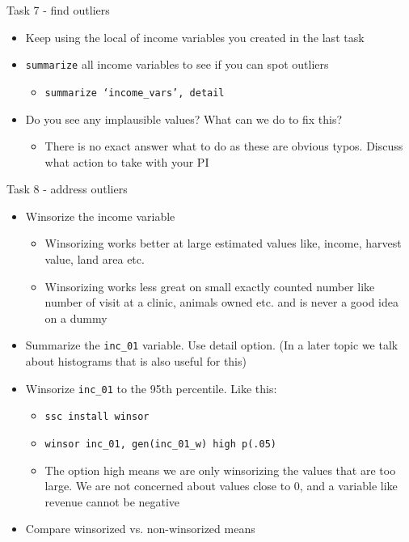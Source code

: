 \documentclass[aspectratio=169]{beamer}
\begin{document}
\begin{frame}{Task 7 - find outliers}
	\begin{itemize}
		\item Keep using the local of income variables you created in the last task
		\item \texttt{summarize} all income variables to see if you can spot outliers
		\begin{itemize}
			\item \texttt{summarize `income\_vars', detail}
		\end{itemize}
		\item Do you see any implausible values? What can we do to fix this?
		\begin{itemize}
			\item There is no exact answer what to do as these are obvious typos. Discuss what action to take with your PI
		\end{itemize}
	\end{itemize}
\end{frame}

\begin{frame}{Task 8 - address outliers}
	\begin{itemize}
		\item Winsorize the income variable
		\begin{itemize}
			\item Winsorizing works better at large estimated values like, income, harvest value, land area etc.
			\item Winsorizing works less great on small exactly counted number like number of visit at a clinic, animals owned etc. and is never a good idea on a dummy
		\end{itemize}
		\item Summarize the \texttt{inc\_01} variable. Use detail option. (In a later topic we talk about histograms that is also useful for this)
		\item Winsorize \texttt{inc\_01} to the 95th percentile. Like this:
			\begin{itemize}
				\item \texttt{ssc install winsor}
				\item \texttt{winsor inc\_01, gen(inc\_01\_w) high p(.05)}
				\item The option high means we are only winsorizing the values that are too large. We are not concerned about values close to 0, and a variable like revenue cannot be negative
			\end{itemize}
		\item Compare winsorized vs. non-winsorized means
	\end{itemize}
\end{frame}
\end{document}
